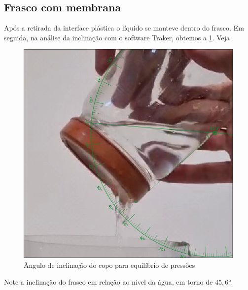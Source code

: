 \subsection{Frasco com membrana}
Após a retirada da interface plástica o líquido se manteve dentro do frasco. Em
seguida, na análise da inclinação com o software Traker, obtemos a \cref{copo.png}. Veja
\begin{figure}[H]
    \centering
    \includegraphics[width=.35\linewidth]{fig/copo.png}
    \caption{Ângulo de inclinação do copo para equilíbrio de pressões}
    \label{copo.png}
\end{figure}

Note a inclinação do frasco em relação ao nível da água, em torno de \( 45,6 \)°.

